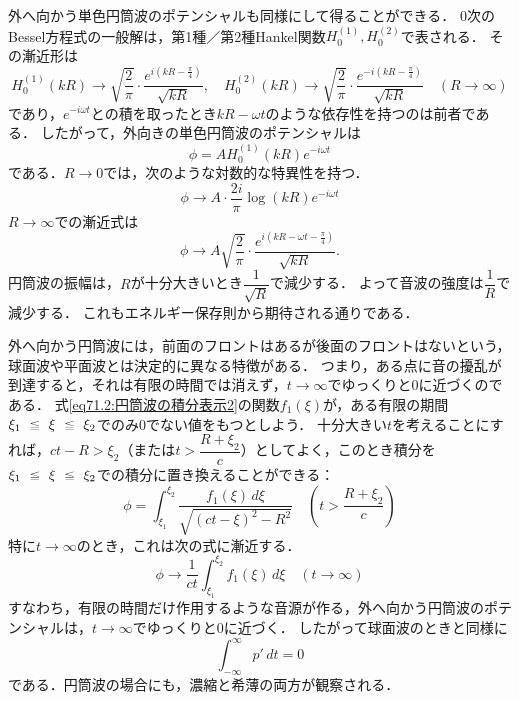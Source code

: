 外へ向かう単色円筒波のポテンシャルも同様にして得ることができる．
0次のBessel方程式の一般解は，第1種／第2種Hankel関数$H_0^{(1)}, H_0^{(2)}$で表される．
その漸近形は
\[
    H_0^{(1)}(kR) \to \sqrt{\frac{2}{\pi}} \cdot \frac{ e^{i(kR-\frac{\pi}{4})}}{\sqrt{kR}}, \quad
    H_0^{(2)}(kR) \to \sqrt{\frac{2}{\pi}} \cdot \frac{ e^{-i(kR-\frac{\pi}{4})}}{\sqrt{kR}} \quad
    (R\to\infty)
\]
であり，$e^{-i\omega t}$との積を取ったとき$kR-\omega t$のような依存性を持つのは前者である．
したがって，外向きの単色円筒波のポテンシャルは
\begin{equation}
    \phi = A H_0^{(1)}(kR) e^{-i\omega t}
\end{equation}
である．$R\to 0$では，次のような対数的な特異性を持つ．
\begin{equation}
    \phi \to A \cdot \frac{2i}{\pi} \log(kR) e^{-i\omega t}
\end{equation}
$R\to\infty$での漸近式は
\begin{equation}
    \phi \to A \sqrt{\frac{2}{\pi}} \cdot \frac{ e^{i(kR-\omega t-\frac{\pi}{4})}}{\sqrt{kR}}.
\end{equation}
円筒波の振幅は，$R$が十分大きいとき$\dfrac{1}{\sqrt{R}}$で減少する．
よって音波の強度は$\dfrac{1}{R}$で減少する．
これもエネルギー保存則から期待される通りである．



外へ向かう円筒波には，前面のフロントはあるが後面のフロントはないという，球面波や平面波とは決定的に異なる特徴がある．
つまり，ある点に音の擾乱が到達すると，それは有限の時間では消えず，$t\to\infty$でゆっくりと0に近づくのである．
式\eqref{eq71.2:円筒波の積分表示2}の関数$f_1(\xi)$が，ある有限の期間$\xi_1 \ika \xi \ika \xi_2$でのみ0でない値をもつとしよう．
十分大きい$t$を考えることにすれば，$ct-R>\xi_2$（または$t>\dfrac{R+\xi_2}{c}$）としてよく，このとき積分を
$\xi_1 \ika \xi \ika \xi_2$での積分に置き換えることができる：
\[
    \phi = \int_{\xi_1}^{\xi_2} \frac{f_1(\xi) \, d\xi}{\sqrt{(ct-\xi)^2-R^2}}
    \quad \left( t>\frac{R+\xi_2}{c} \right)
\]
特に$t\to\infty$のとき，これは次の式に漸近する．
\[
    \phi \to \frac{1}{ct} \int_{\xi_1}^{\xi_2} f_1(\xi) \, d\xi
    \quad (t\to\infty)
\]
すなわち，有限の時間だけ作用するような音源が作る，外へ向かう円筒波のポテンシャルは，$t\to\infty$でゆっくりと0に近づく．
したがって球面波のときと同様に
\begin{equation}
    \int_{-\infty}^{\infty} p' \, dt  = 0 
\end{equation}
である．円筒波の場合にも，濃縮と希薄の両方が観察される．












\BackToTheToc